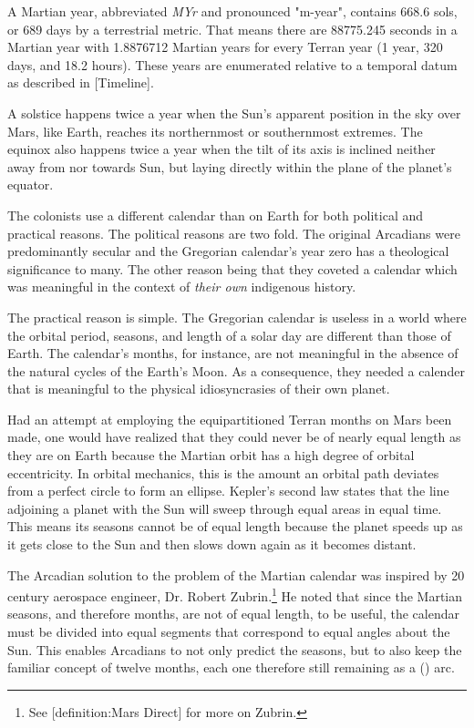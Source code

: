 A Martian year, abbreviated {\it MYr} and pronounced "m-year", contains 668.6 sols, or 689 days by a terrestrial metric. That means there are 88775.245 seconds in a Martian year with 1.8876712 Martian years for every Terran year (1 year, 320 days, and 18.2 hours). These years are enumerated relative to a temporal datum as described in [Timeline].


A solstice happens twice a year when the Sun's apparent position in the sky over Mars, like Earth, reaches its northernmost or southernmost extremes. The equinox also happens twice a year when the tilt of its axis is inclined neither away from nor towards Sun, but laying directly within the plane of the planet's equator.


The colonists use a different calendar than on Earth for both political and practical reasons. The political reasons are two fold. The original Arcadians were predominantly secular and the Gregorian calendar's year zero has a theological significance to many. The other reason being that they coveted a calendar which was meaningful in the context of {\it their own} indigenous history.

The practical reason is simple. The Gregorian calendar is useless in a world where the orbital period, seasons, and length of a solar day are different than those of Earth. The calendar's months, for instance, are not meaningful in the absence of the natural cycles of the Earth's Moon. As a consequence, they needed a calender that is meaningful to the physical idiosyncrasies of their own planet.

Had an attempt at employing the equipartitioned Terran months on Mars been made, one would have realized that they could never be of nearly equal length as they are on Earth because the Martian orbit has a high degree of orbital eccentricity. In orbital mechanics, this is the amount an orbital path deviates from a perfect circle to form an ellipse. Kepler's second law states that the line adjoining a planet with the Sun will sweep through equal areas in equal time. This means its seasons cannot be of equal length because the planet speeds up as it gets close to the Sun and then slows down again as it becomes distant.

The Arcadian solution to the problem of the Martian calendar was inspired by 20 century aerospace engineer, Dr. Robert Zubrin.\footnote{See [definition:Mars Direct] for more on Zubrin.} He noted that since the Martian seasons, and therefore months, are not of equal length, to be useful, the calendar must be divided into equal segments that correspond to equal angles about the Sun. This enables Arcadians to not only predict the seasons, but to also keep the familiar concept of twelve months, each one therefore still remaining as a  () arc. 

